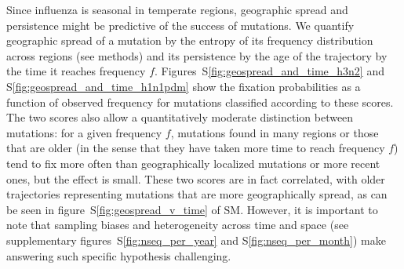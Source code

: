 \documentclass[reprint,amsmath,amssymb,superscriptaddress,showpacs,rmp]{revtex4-1}
\newcommand{\sref}[1]{S\ref{#1}}
\begin{document}
Since influenza is seasonal in temperate regions, geographic spread and persistence might be predictive of the success of mutations.
We quantify geographic spread of a mutation by the entropy of its frequency distribution across regions (see methods) and its persistence by the age of the trajectory by the time it reaches frequency $f$.
Figures~\sref{fig:geospread_and_time_h3n2} and \sref{fig:geospread_and_time_h1n1pdm} show the fixation probabilities as a function of observed frequency for mutations classified according to these scores.
The two scores also allow a quantitatively moderate distinction between mutations: for a given frequency $f$, mutations found in many regions or those that are older (in the sense that they have taken more time to reach frequency $f$) tend to fix more often than geographically localized mutations or more recent ones, but the effect is small.
These two scores are in fact correlated, with older trajectories representing mutations that are more geographically spread, as can be seen in figure~\sref{fig:geospread_v_time} of SM.
However, it is important to note that sampling biases and heterogeneity across time and space (see supplementary figures~\sref{fig:nseq_per_year} and \sref{fig:nseq_per_month}) make answering such specific hypothesis challenging.
\end{document}

